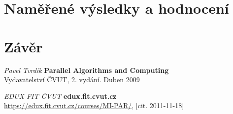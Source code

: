 \documentclass[]{article}
\begin{document}
\section{Naměřené výsledky a hodnocení}

\section{Závěr}

\newpage
\begin{thebibliography}{9}

{\em Pavel Tvrdík}
       {\bf Parallel Algorithms and Computing}\\
		Vydavatelství ČVUT, 2. vydání. Duben 2009

{\em EDUX FIT ČVUT}
       {\bf edux.fit.cvut.cz}\\
       \url{https://edux.fit.cvut.cz/courses/MI-PAR/}, [cit. 2011-11-18]
       
 \end{thebibliography}
\end{document}
